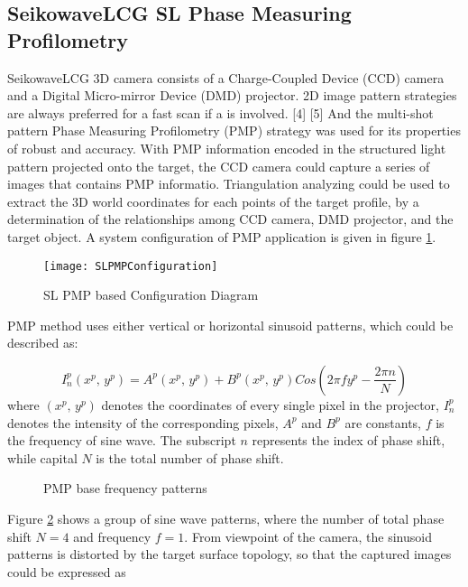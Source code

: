 \subsection{SeikowaveLCG SL Phase Measuring Profilometry}
SeikowaveLCG 3D camera consists of a Charge-Coupled Device (CCD) camera and a Digital Micro-mirror Device (DMD) projector. 2D image pattern strategies are always preferred for a fast scan if a is involved. 
[4]%
 [5] %
And the multi-shot pattern Phase Measuring Profilometry (PMP) strategy was used for its properties of robust and accuracy.
With PMP information encoded in the structured light pattern projected onto the target, the CCD camera could capture a series of images that contains PMP informatio. Triangulation analyzing could be used to extract the 3D world coordinates for each points of the target profile, by a determination of the relationships among CCD camera, DMD projector, and the target object. A system configuration of PMP application is given in figure \ref{SLPMPConfiguration}.\par%
%
\begin{figure}[h]
\centering
\texttt{[image: SLPMPConfiguration]}
\caption{SL PMP based Configuration Diagram}
\label{SLPMPConfiguration}
\end{figure}%
%
PMP method uses either vertical or horizontal sinusoid patterns, which could be described as:

 \begin{equation}
%
I^p_n(x^p, \, y^p) %
= A^p(x^p, \, y^p) + B^p(x^p, \, y^p)Cos(2\pi fy^p - \frac{2\pi n}{N})
%
\end{equation}%
%
where \((x^p, \, y^p)\) denotes the coordinates of every single pixel in the projector, \(I^p_n\) denotes the intensity of the corresponding pixels, \(A^p\) and \(B^p\) are constants, \(f\) is the frequency of sine wave. The subscript \(n\) represents the index of phase shift, while capital \(N\) is the total number of phase shift.\par%
%
%
 \begin{figure}[h]
\hspace*{-2cm} 
{}
\caption{PMP base frequency patterns}
\label{PMPFrequencyPatterns}
\end{figure}%
%
%
Figure \ref{PMPFrequencyPatterns} shows a group of sine wave patterns, where the number of total phase shift \(N = 4\) and frequency \(f = 1\). From viewpoint of the camera, the sinusoid patterns is distorted by the target surface topology, so that the captured images could be expressed as 

